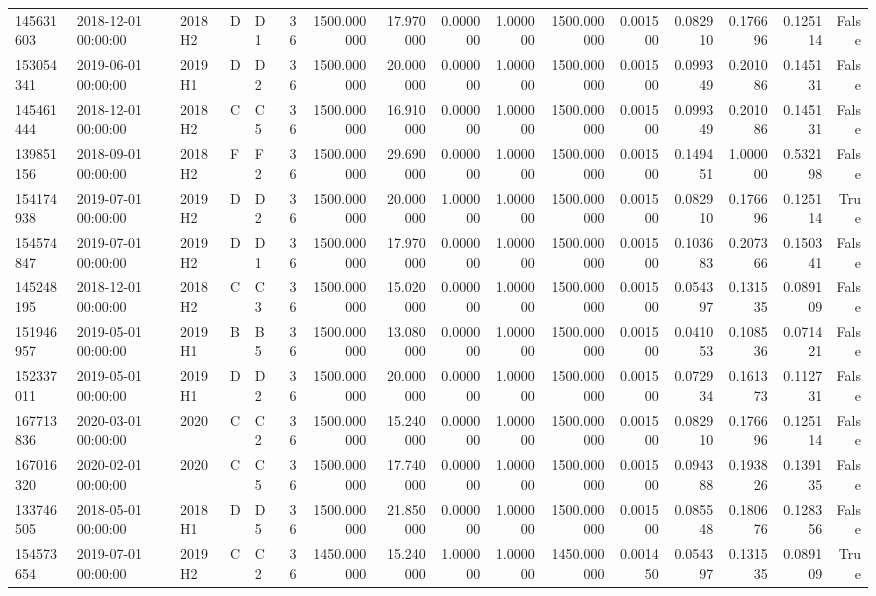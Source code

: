 \begin{tabular}{lllllrrrrrrrrrrr}
145631603 & 2018-12-01 00:00:00 & 2018H2 & D & D1 & 36 & 1500.000000 & 17.970000 & 0.000000 & 1.000000 & 1500.000000 & 0.001500 & 0.082910 & 0.176696 & 0.125114 & False \\
153054341 & 2019-06-01 00:00:00 & 2019H1 & D & D2 & 36 & 1500.000000 & 20.000000 & 0.000000 & 1.000000 & 1500.000000 & 0.001500 & 0.099349 & 0.201086 & 0.145131 & False \\
145461444 & 2018-12-01 00:00:00 & 2018H2 & C & C5 & 36 & 1500.000000 & 16.910000 & 0.000000 & 1.000000 & 1500.000000 & 0.001500 & 0.099349 & 0.201086 & 0.145131 & False \\
139851156 & 2018-09-01 00:00:00 & 2018H2 & F & F2 & 36 & 1500.000000 & 29.690000 & 0.000000 & 1.000000 & 1500.000000 & 0.001500 & 0.149451 & 1.000000 & 0.532198 & False \\
154174938 & 2019-07-01 00:00:00 & 2019H2 & D & D2 & 36 & 1500.000000 & 20.000000 & 1.000000 & 1.000000 & 1500.000000 & 0.001500 & 0.082910 & 0.176696 & 0.125114 & True \\
154574847 & 2019-07-01 00:00:00 & 2019H2 & D & D1 & 36 & 1500.000000 & 17.970000 & 0.000000 & 1.000000 & 1500.000000 & 0.001500 & 0.103683 & 0.207366 & 0.150341 & False \\
145248195 & 2018-12-01 00:00:00 & 2018H2 & C & C3 & 36 & 1500.000000 & 15.020000 & 0.000000 & 1.000000 & 1500.000000 & 0.001500 & 0.054397 & 0.131535 & 0.089109 & False \\
151946957 & 2019-05-01 00:00:00 & 2019H1 & B & B5 & 36 & 1500.000000 & 13.080000 & 0.000000 & 1.000000 & 1500.000000 & 0.001500 & 0.041053 & 0.108536 & 0.071421 & False \\
152337011 & 2019-05-01 00:00:00 & 2019H1 & D & D2 & 36 & 1500.000000 & 20.000000 & 0.000000 & 1.000000 & 1500.000000 & 0.001500 & 0.072934 & 0.161373 & 0.112731 & False \\
167713836 & 2020-03-01 00:00:00 & 2020 & C & C2 & 36 & 1500.000000 & 15.240000 & 0.000000 & 1.000000 & 1500.000000 & 0.001500 & 0.082910 & 0.176696 & 0.125114 & False \\
167016320 & 2020-02-01 00:00:00 & 2020 & C & C5 & 36 & 1500.000000 & 17.740000 & 0.000000 & 1.000000 & 1500.000000 & 0.001500 & 0.094388 & 0.193826 & 0.139135 & False \\
133746505 & 2018-05-01 00:00:00 & 2018H1 & D & D5 & 36 & 1500.000000 & 21.850000 & 0.000000 & 1.000000 & 1500.000000 & 0.001500 & 0.085548 & 0.180676 & 0.128356 & False \\
154573654 & 2019-07-01 00:00:00 & 2019H2 & C & C2 & 36 & 1450.000000 & 15.240000 & 1.000000 & 1.000000 & 1450.000000 & 0.001450 & 0.054397 & 0.131535 & 0.089109 & True \\

\end{tabular}
